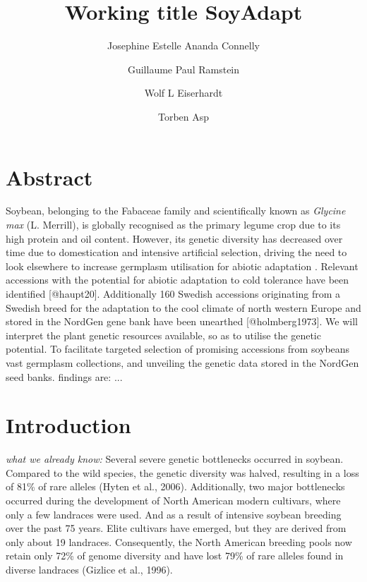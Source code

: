 \documentclass[9pt, onecolumn,twoside]{gsajnl}
\title{Working title SoyAdapt}
\author[1,$\dagger$,$\ast$]{Josephine Estelle Ananda Connelly}
\author[2]{Guillaume Paul Ramstein}
\author[3]{Wolf L Eiserhardt}
\author[4]{Torben Asp}
\affil[1,2,4]{Centre for Quantitative Genetics and Genomics, Faculty of Technical Sciences, Aarhus University (DK).}
\affil[1,3]{Department of Biology, Faculty of Natural Sciences, Aarhus University, (DK).}
\affil[3]{Royal Botanic Gardens, Kew, (UK).}
\begin{document}
\maketitle
\thispagestyle{firststyle}
\vspace{-13pt}%


\section{Abstract}

Soybean, belonging to the Fabaceae family and scientifically known as \textit{Glycine max} (L. Merrill), is globally recognised as the primary legume crop due to its high protein and oil content. However, its genetic diversity has decreased over time due to domestication and intensive artificial selection, driving the need to look elsewhere to increase germplasm utilisation for abiotic adaptation \citep{hyten06, gizlice96}.  Relevant accessions with the potential for abiotic adaptation to cold tolerance have been identified [@haupt20]. Additionally 160 Swedish accessions originating from a Swedish breed for the adaptation to the cool climate of north western Europe and stored in the NordGen gene bank have been unearthed [@holmberg1973]. We will interpret the plant genetic resources available, so as to utilise the genetic potential. To facilitate targeted selection of promising accessions from soybeans vast germplasm collections,  and unveiling the genetic data stored in the NordGen seed banks. findings are: ... 

\section{Introduction}

\textit{what we already know:} Several severe genetic bottlenecks occurred in soybean. Compared to the wild species, the genetic diversity was halved, resulting in a loss of 81\% of rare alleles (Hyten et al., 2006). Additionally, two major bottlenecks occurred during the development of North American modern cultivars, where only a few landraces were used. And as a result of intensive soybean breeding over the past 75 years. Elite cultivars have emerged, but they are derived from only about 19 landraces. Consequently, the North American breeding pools now retain only 72\% of genome diversity and have lost 79\% of rare alleles found in diverse landraces (Gizlice et al., 1996).
\end{document}
